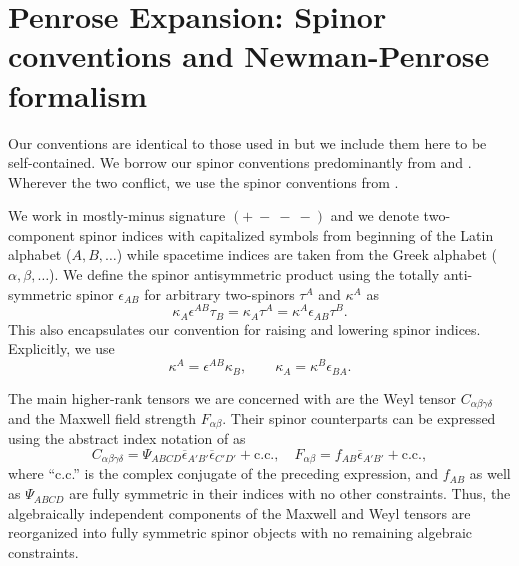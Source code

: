 	\chapter{Penrose Expansion: Spinor conventions and Newman-Penrose formalism}\label{Expansion:app:NP}
	
	Our conventions are identical to those used in \cite{Chawla:2024mse} but we include them here to be
	self-contained. We borrow our spinor conventions predominantly from \cite{Penrose:1985bww} and \cite{Stephani:2003tm}. Wherever the
	two conflict, we use the spinor conventions from \cite{Penrose:1985bww}. 
	
	We work in mostly-minus signature $(+\ -\ -\ -)$ and we denote two-component spinor indices with capitalized symbols from beginning of the Latin alphabet ($A, B, \ldots$) while spacetime indices are taken from the Greek alphabet ($\alpha, \beta, \ldots$). We define the spinor antisymmetric product using the totally anti-symmetric spinor $\epsilon_{AB}$ for arbitrary two-spinors $\tau^{A}$ and $\kappa^{A}$  as
	\begin{equation}  
	\kappa_{A} \epsilon^{AB} \tau_{B} = \kappa_{A} \tau^{A} = \kappa^{A} \epsilon_{AB} \tau^{B}.
	\end{equation}
	This also encapsulates our convention for raising and lowering spinor indices. Explicitly, we use
	\begin{equation}  
	\kappa^{A} = \epsilon^{AB} \kappa_{B}, \qquad \kappa_{A} = \kappa^{B} \epsilon_{BA}.
	\end{equation}
	
	The main higher-rank tensors we are concerned with are the Weyl tensor $C_{\alpha \beta \gamma \delta}$ and the Maxwell
	field strength $F_{\alpha \beta}$. Their spinor counterparts can be expressed using the abstract index notation of
	\cite{Penrose:1985bww} as 
	\begin{equation} \label{Expansion:eqn:app:curvaturespinors} 
	C_{\alpha \beta \gamma \delta} = \Psi_{ABCD} \overline{\epsilon}_{A' B'} \overline{\epsilon}_{C' D'} + \text{c.c.}, \quad
	F_{\alpha \beta} = f_{AB} \overline{\epsilon}_{A'B'} + \text{c.c.},
	\end{equation}
	where ``c.c.'' is the complex conjugate of the preceding expression, and $f_{AB}$ as well as $\Psi_{ABCD}$ are
	fully symmetric in their indices with no other constraints. Thus, the algebraically independent components of the
	Maxwell and Weyl tensors are reorganized into fully symmetric spinor objects with no remaining algebraic
	constraints.
	
